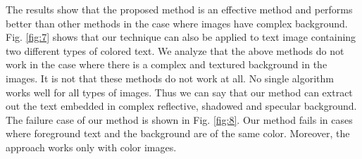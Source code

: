 The results show that the proposed method is an effective method and performs better than other methods 
in the case where images have
complex background. Fig. \ref{fig:7} shows that our technique can also be applied to text image containing 
two different types of colored text.
We analyze that the above methods do not work in the case where there is a complex and textured background in the images.
It is not that these methods do not work at all. No single algorithm works well for all types of images. Thus we can say
that our method can extract out the text embedded in complex reflective, shadowed and
specular background.
The failure case of our method is shown in Fig. \ref{fig:8}.
Our method fails in cases where foreground text and the background are of the same color.
Moreover, the approach works only with color images.



% 
% 
% 

